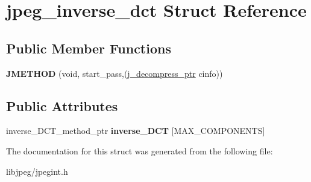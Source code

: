 \hypertarget{structjpeg__inverse__dct}{\section{jpeg\-\_\-inverse\-\_\-dct Struct Reference}
\label{structjpeg__inverse__dct}
}
\subsection*{Public Member Functions}
\begin{DoxyCompactItemize}
\item 
\hypertarget{structjpeg__inverse__dct_a2e9c37cdc48deba795ea5ede7834a3c0}{{\bfseries J\-M\-E\-T\-H\-O\-D} (void, start\-\_\-pass,(\hyperlink{structjpeg__decompress__struct}{j\-\_\-decompress\-\_\-ptr} cinfo))}\label{structjpeg__inverse__dct_a2e9c37cdc48deba795ea5ede7834a3c0}

\end{DoxyCompactItemize}
\subsection*{Public Attributes}
\begin{DoxyCompactItemize}
\item 
\hypertarget{structjpeg__inverse__dct_aa05e35a50f28daf199d2efa702a72c2a}{inverse\-\_\-\-D\-C\-T\-\_\-method\-\_\-ptr {\bfseries inverse\-\_\-\-D\-C\-T} \mbox{[}M\-A\-X\-\_\-\-C\-O\-M\-P\-O\-N\-E\-N\-T\-S\mbox{]}}\label{structjpeg__inverse__dct_aa05e35a50f28daf199d2efa702a72c2a}

\end{DoxyCompactItemize}


The documentation for this struct was generated from the following file\-:\begin{DoxyCompactItemize}
\item 
libjpeg/jpegint.\-h\end{DoxyCompactItemize}

